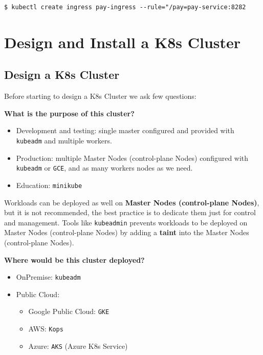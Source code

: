 \documentclass{article}
\newenvironment{blocktemplateIII}[1]{%
    \tcolorbox[beamer,%
    noparskip,breakable,
    ,colframe=Red,%
    colbacklower=LimeGreen!75!LightGreen,%
    title=#1]}%
    {\endtcolorbox}
\newenvironment{codetemplate}[1][]{%
  \mybasecolorbox[#1]
  \itshape
}{%
  \endmybasecolorbox
}
\begin{document}
\begin{codetemplate}{}
\begin{verbatim}
$ kubectl create ingress pay-ingress --rule="/pay=pay-service:8282
\end{verbatim}
\end{codetemplate}

\newpage
\section{Design and Install a K8s Cluster}
\subsection{Design a K8s Cluster}
Before starting to design a K8s Cluster we ask few questions:

\textbf{What is the purpose of this cluster?}
\begin{itemize}
    \item Development and testing: single master configured and provided with \verb|kubeadm| and multiple workers.
    \item Production: multiple Master Nodes (control-plane Nodes) configured with \verb|kubeadm| or \verb|GCE|, and as many workers nodes as we need.
    \item Education: \verb|minikube|
\end{itemize}

\begin{blocktemplateIII}{WARNING}
Workloads can be deployed as well on \textbf{Master Nodes (control-plane Nodes)}, but it is not recommended, the best practice is to dedicate them just for control and management. 
Tools like \verb|kubeadmin| prevents workloads to be deployed on Master Nodes (control-plane Nodes) by adding a \textbf{taint} into the Master Nodes (control-plane Nodes).
\end{blocktemplateIII}

\textbf{Where would be this cluster deployed?}
\begin{itemize}
    \item OnPremise: \verb|kubeadm|
    \item Public Cloud:
    \begin{itemize}
        \item Google Public Cloud: \verb|GKE|
        \item AWS: \verb|Kops|
        \item Azure: \verb|AKS| (Azure K8s Service)
    \end{itemize}
\end{itemize}
\end{document}
